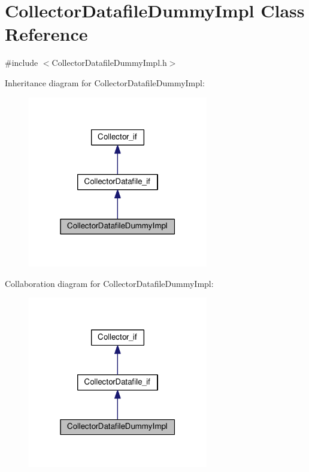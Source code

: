 \hypertarget{class_collector_datafile_dummy_impl}{}\section{Collector\+Datafile\+Dummy\+Impl Class Reference}
\label{class_collector_datafile_dummy_impl}


{\ttfamily \#include $<$Collector\+Datafile\+Dummy\+Impl.\+h$>$}



Inheritance diagram for Collector\+Datafile\+Dummy\+Impl\+:\nopagebreak
\begin{figure}[H]
\begin{center}
\leavevmode
\includegraphics[width=223pt]{class_collector_datafile_dummy_impl__inherit__graph}
\end{center}
\end{figure}


Collaboration diagram for Collector\+Datafile\+Dummy\+Impl\+:\nopagebreak
\begin{figure}[H]
\begin{center}
\leavevmode
\includegraphics[width=223pt]{class_collector_datafile_dummy_impl__coll__graph}
\end{center}
\end{figure}
